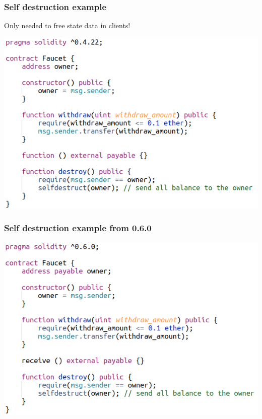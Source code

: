 \documentclass[11pt]{beamer}  %
\begin{document}
\begin{frame}\frametitle{Self destruction example}

  Only needed to free state data in clients!

  \begin{center}
    \includegraphics[scale=0.5,clip=false]{pictures/selfdestruct.png}
  \end{center}

\end{frame}

\begin{frame}\frametitle{Self destruction example from 0.6.0}

  \begin{center}
    \includegraphics[scale=0.5,clip=false]{pictures/selfdestruct_6_0.png}
  \end{center}

\end{frame}
\end{document}
